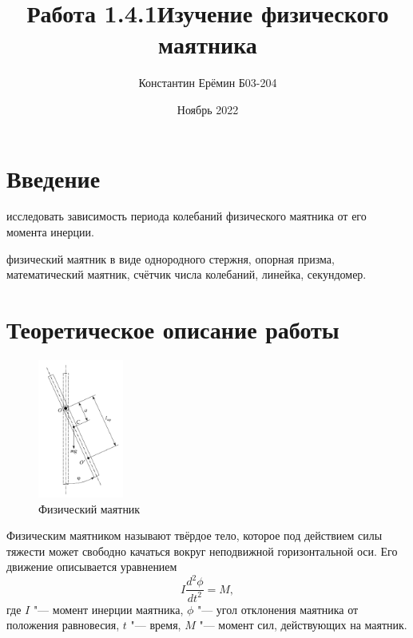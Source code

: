 

\title{\textbf{Работа 1.4.1}\linebreak Изучение физического маятника}
\author{Константин Ерёмин Б03-204}
\date{Ноябрь 2022}


    \maketitle

    \section{Введение}
        \begin{target}
            исследовать зависимость периода колебаний физического маятника от его момента инерции.
        \end{target}

        \begin{setting}
            физический маятник в виде однородного стержня, опорная призма, математический маятник, счётчик числа колебаний, линейка, секундомер.
        \end{setting}

    \section{Теоретическое описание работы}
        \begin{figure}
            \vspace{-0.5cm}
            \includegraphics[width=0.25\textwidth]{pendulum}
            \caption{Физический маятник}
            \label{fig:pendulum}
        \end{figure}

        Физическим маятником называют твёрдое тело, которое под действием силы тяжести может свободно качаться вокруг неподвижной горизонтальной оси. Его движение описывается уравнением
        \begin{equation}
            I\frac{d^2\phi}{dt^2}=M,
        \end{equation}
        где $I$ "--- момент инерции маятника, $\phi$ "--- угол отклонения маятника от положения равновесия, $t$ "--- время, $M$ "--- момент сил, действующих на маятник.

